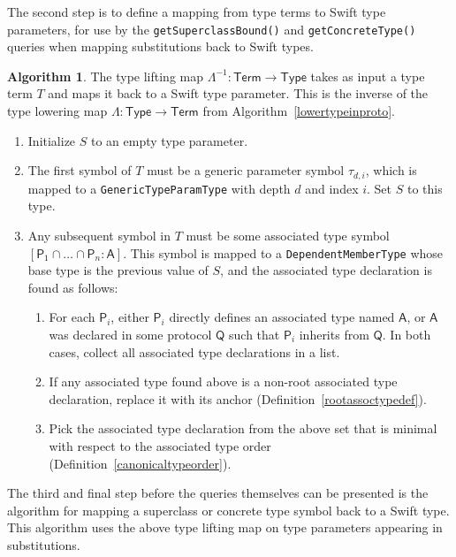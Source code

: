 \documentclass[headsepline,bibliography=totoc]{scrreport}
\newcommand{\namesym}[1]{\mathsf{#1}}
\newcommand{\proto}[1]{\bm{\mathsf{#1}}}
\theoremstyle{definition}
\theoremstyle{definition}
\theoremstyle{definition}
\newtheorem{algorithm}{Algorithm}[chapter]
\begin{document}
The second step is to define a mapping from type terms to Swift type parameters, for use by the \texttt{getSuperclassBound()} and \texttt{getConcreteType()} queries when mapping substitutions back to Swift types.
\begin{algorithm} The type lifting map $\Lambda^{-1}:\namesym{Term}\rightarrow\namesym{Type}$ takes as input
a type term $T$ and maps it back to a Swift type parameter. This is the inverse of the type lowering
map $\Lambda\colon\namesym{Type}\rightarrow\namesym{Term}$ from Algorithm~\ref{lowertypeinproto}.
\begin{enumerate}
\item Initialize $S$ to an empty type parameter.
\item The first symbol of $T$ must be a generic parameter symbol $\tau_{d,i}$, which is mapped to a
\texttt{GenericTypeParamType} with depth $d$ and index $i$. Set $S$ to this type.
\item Any subsequent symbol in $T$ must be some associated type symbol
$[\proto{P}_1\cap\ldots\cap\proto{P}_n\colon\namesym{A}]$. This symbol is mapped to a
\texttt{DependentMemberType} whose base type is the previous value of $S$, and the associated type
declaration is found as follows:
\begin{enumerate}
\item For each $\proto{P}_i$, either $\proto{P}_i$ directly defines an associated type named
$\namesym{A}$, or $\namesym{A}$ was declared in some protocol $\proto{Q}$ such that $\proto{P}_i$
inherits from $\proto{Q}$. In both cases, collect all associated type declarations in a list.
\item If any associated type found above is a non-root associated type declaration, replace it with
its anchor (Definition~\ref{rootassoctypedef}).
\item Pick the associated type declaration from the above set that is minimal with respect to the
associated type order (Definition~\ref{canonicaltypeorder}).
\end{enumerate}
\end{enumerate}
\end{algorithm}
The third and final step before the queries themselves can be presented is the algorithm for mapping a superclass or concrete type symbol back to a Swift type. This algorithm uses the above type lifting map on type parameters appearing in substitutions.
\end{document}

